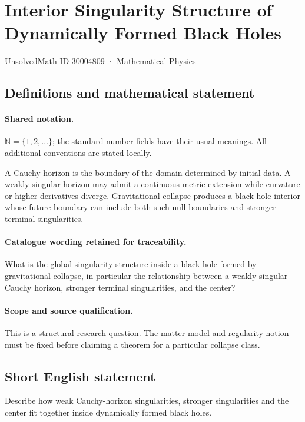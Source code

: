 \documentclass[11pt]{article}
\begin{document}
\setcounter{section}{30004808}
\section{Interior Singularity Structure of Dynamically Formed Black Holes}\label{30004809}
{\small UnsolvedMath ID 30004809 · Mathematical Physics}
\subsection{Definitions and mathematical statement}

\paragraph{Shared notation.}$\mathbb N=\{1,2,\ldots\}$; the standard number fields have their usual meanings. All additional conventions are stated locally.


A Cauchy horizon is the boundary of the domain determined by initial data. A weakly singular horizon may admit a continuous metric extension while curvature or higher derivatives diverge. Gravitational collapse produces a black-hole interior whose future boundary can include both such null boundaries and stronger terminal singularities.

\paragraph{Catalogue wording retained for traceability.}
What is the global singularity structure inside a black hole formed by gravitational collapse, in particular the relationship between a weakly singular Cauchy horizon, stronger terminal singularities, and the center?

\paragraph{Scope and source qualification.}This is a structural research question. The matter model and regularity notion must be fixed before claiming a theorem for a particular collapse class.
\subsection{Short English statement}
Describe how weak Cauchy-horizon singularities, stronger singularities and the center fit together inside dynamically formed black holes.
\end{document}
